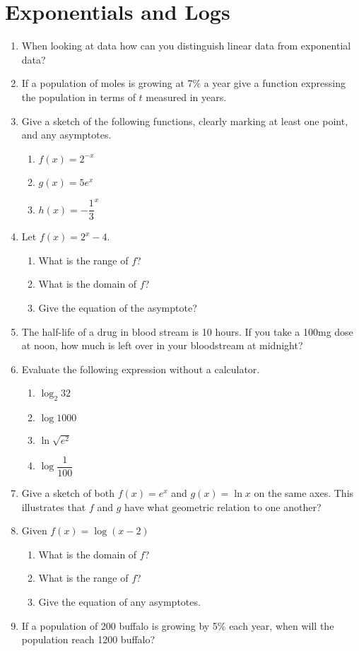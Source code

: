 \documentclass[12pt]{article}
\theoremstyle{plain}     %
\begin{document}
\section{Exponentials and Logs}
\begin{enumerate}
	\item When looking at data how can you distinguish linear data from exponential data?
	\item If a population of moles is growing at 7\% a year give a function expressing the population in terms of $t$ measured in years.
	\item Give a sketch of the following functions, clearly marking at least one point, and any asymptotes.
		\begin{enumerate}
			\item $f(x)=2^{-x}$
			\item $g(x)=5e^x$
			\item $h(x)=-\dfrac{1}{3}^x$
		\end{enumerate}
	\item Let $f(x)=2^x-4$.
		\begin{enumerate}
			\item What is the range of $f$?
			\item What is the domain of $f$?
			\item Give the equation of the asymptote?
		\end{enumerate}
	\item The half-life of a drug in blood stream is 10 hours. If you take a 100mg dose at noon, how much is left over in your bloodstream at midnight?
	\item Evaluate the following expression without a calculator.
		\begin{enumerate}
			\item $\log_2 32$
			\item $\log 1000$
			\item $\ln \sqrt{e^2}$
			\item $\log \dfrac{1}{100}$
		\end{enumerate}
	\item Give a sketch of both $f(x)=e^x$ and $g(x)=\ln x$ on the same axes. This illustrates that $f$ and $g$ have what geometric relation to one another?
	\item Given $f(x)=\log (x-2)$
		\begin{enumerate}
			\item What is the domain of $f$?
			\item What is the range of $f$?
			\item Give the equation of any asymptotes.
		\end{enumerate}
	\item If a population of 200 buffalo is growing by 5\% each year, when will the population reach 1200 buffalo?
\end{enumerate}
\end{document}
